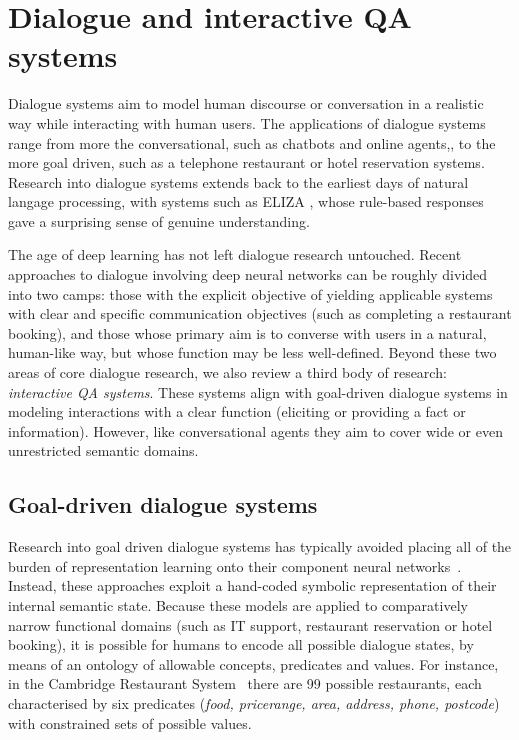 \documentclass[11pt,letterpaper]{article}
\begin{document}
\section{Dialogue and interactive QA systems}

Dialogue systems aim to model human discourse or conversation in a realistic way while interacting with human users. The applications of dialogue systems range from more the conversational, such as chatbots and online agents,, to the more goal driven, such as a telephone restaurant or hotel reservation systems. Research into dialogue systems extends back to the earliest days of natural langage processing, with systems such as ELIZA \cite{weizenbaum1966eliza}, whose rule-based responses gave a surprising sense of genuine understanding.     

The age of deep learning has not left dialogue research untouched. Recent approaches to dialogue involving deep neural networks can be roughly divided into two camps: those with the explicit objective of yielding applicable systems with clear and specific communication objectives (such as completing a restaurant booking), and those whose primary aim is to converse with users in a natural, human-like way, but whose function may be less well-defined. Beyond these two areas of core dialogue research, we also review a third body of research: \emph{interactive QA systems}. These systems align with goal-driven dialogue systems in modeling interactions with a clear function (eliciting or providing a fact or information). However, like conversational agents they aim to cover wide or even unrestricted semantic domains.     

\subsection{Goal-driven dialogue systems}
Research into goal driven dialogue systems has typically avoided placing all of the burden of representation learning onto their component neural networks~\cite{henderson2014word,mrkvsic2015multi,wen2015stochastic,wen2015semantically}. Instead, these approaches exploit a hand-coded symbolic representation of their internal semantic state. Because these models are applied to comparatively narrow functional domains (such as IT support, restaurant reservation or hotel booking), it is possible for humans to encode all possible dialogue states, by means of an ontology of allowable concepts, predicates and values. For instance, in the Cambridge Restaurant System~\cite{wen2016network} there are 99 possible restaurants, each characterised by six predicates (\emph{food, pricerange, area, address, phone, postcode}) with constrained sets of possible values. 
\end{document}
